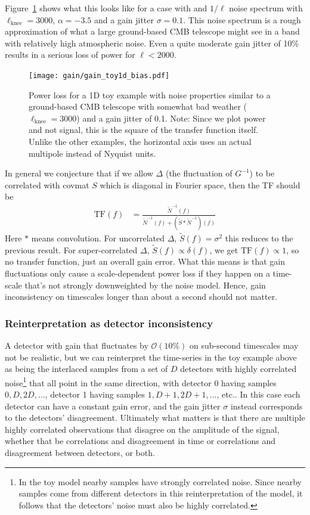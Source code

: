 \documentclass[twocolumn,apj]{aastex63}
\begin{document}
Figure~\ref{fig:gain-tf-1d} shows what this looks like for a case with
and $1/\ell$ noise spectrum with
$\ell_\text{knee} = 3000$, $\alpha = -3.5$ and a gain jitter $\sigma = 0.1$.
This noise spectrum is a rough approximation of what a large ground-based CMB telescope
might see in a band with relatively high atmospheric noise. Even a quite moderate
gain jitter of 10\% results in a serious loss of power for $\ell < 2000$.
\begin{figure}[ht]
	\centering
	\texttt{[image: gain/gain\_toy1d\_bias.pdf]}
	\caption{Power loss for a 1D toy example with noise properties similar to
	a ground-based CMB telescope with somewhat bad weather ($\ell_\text{knee}=3000$)
	and a gain jitter of 0.1. Note: Since we plot power and not signal, this is the
	square of the transfer function itself. Unlike the other examples, the horizontal axis
	uses an actual multipole instead of Nyquist units.}
	\label{fig:gain-tf-1d}
\end{figure}

In general we conjecture that if we allow $\Delta$ (the fluctuation of $G^{-1}$)
to be correlated with covmat $S$ which is diagonal in Fourier space, then the TF should be
\begin{align}
\text{TF}(f) &= \frac{\widetilde{N}^{-1}(f)}{\widetilde{N}^{-1}(f) + (\widetilde{S} \ast \widetilde{N}^{-1})(f)}
\end{align}
Here $\ast$ means convolution. For uncorrelated $\Delta$, $\widetilde S(f) = \sigma^2$
this reduces to the previous result.
For super-correlated $\Delta$, $\widetilde S(f) \propto \delta(f)$, we get $\text{TF}(f) \propto 1$,
so no transfer function, just an overall gain error. What this means is that gain fluctuations
only cause a scale-dependent power loss if they happen on a time-scale that's not strongly
downweighted by the noise model. Hence, gain inconsistency on timescales longer than about a
second should not matter.

\subsubsection{Reinterpretation as detector inconsistency}
A detector with gain that fluctuates by $\mathcal{O}(10\%)$ on sub-second timescales may not be
realistic, but we can reinterpret the time-series in the toy example above as being the interlaced
samples from a set of $D$ detectors with highly correlated noise\footnote{
In the toy model nearby samples have strongly correlated noise. Since nearby samples come from
different detectors in this reinterpretation of the model, it follows that the detectors' noise
must also be highly correlated.
} that all point in the same direction, with detector 0 having
samples $0,D,2D,\ldots$, detector 1 having samples $1,D+1,2D+1,\ldots$, etc.. In this case each detector
can have a constant gain error, and the gain jitter $\sigma$ instead corresponds to the detectors'
disagreement. Ultimately what matters is that there are multiple highly correlated observations
that disagree on the amplitude of the signal, whether that be correlations and disagreement in
time or correlations and disagreement between detectors, or both.
\end{document}
